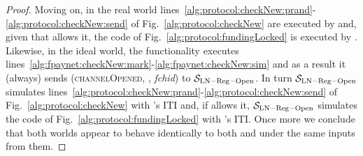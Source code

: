 \begin{proof}
  Moving on, in the real world
  lines~\ref{alg:protocol:checkNew:prand}-\ref{alg:protocol:checkNew:send} of
  Fig.~\ref{alg:protocol:checkNew} are executed by \alice{} and, given that
  \adversary{} allows it, the code of Fig.~\ref{alg:protocol:fundingLocked} is
  executed by \bob. Likewise, in the ideal world, the functionality executes
  lines~\ref{alg:fpaynet:checkNew:mark}-\ref{alg:fpaynet:checkNew:sim} and as
  a result it (always) sends (\textsc{channelOpened}, \alice, \textit{fchid})
  to $\mathcal{S}_{\mathrm{LN - Reg - Open}}$. In turn $\mathcal{S}_{\mathrm{LN -
  Reg - Open}}$ simulates
  lines~\ref{alg:protocol:checkNew:prand}-\ref{alg:protocol:checkNew:send} of
  Fig.~\ref{alg:protocol:checkNew} with \alice's ITI and, if \adversary{}
  allows it, $\mathcal{S}_{\mathrm{LN - Reg - Open}}$ simulates the code of
  Fig.~\ref{alg:protocol:fundingLocked} with \bob's ITI. Once more we conclude
  that both worlds appear to behave identically to both \environment{} and
  \adversary{} under the same inputs from them.
\end{proof}
